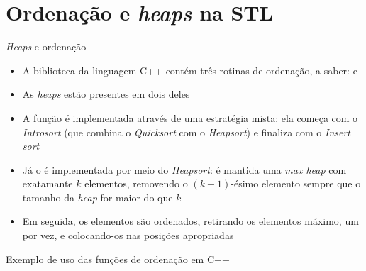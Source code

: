 \section{Ordenação e {\it heaps} na STL}

\begin{frame}[fragile]{{\it Heaps} e ordenação}

    \begin{itemize}
        \item A biblioteca  da linguagem C++ contém três rotinas de 
            ordenação, a saber:  e 

        \item As \textit{heaps} estão presentes em dois deles

        \item A função  é implementada através de uma estratégia mista: ela
            começa com o \textit{Introsort} (que combina o \textit{Quicksort} com o \textit{Heapsort}) e 
            finaliza com o \textit{Insert sort}

        \item Já o  é implementada por meio do \textit{Heapsort}: é mantida
            uma \textit{max heap} com exatamante $k$ elementos, removendo o $(k + 1)$-ésimo
            elemento sempre que o tamanho da \textit{heap} for maior do que $k$

        \item Em seguida, os elementos são ordenados, retirando os elementos máximo, um por vez,
            e colocando-os nas posições apropriadas
    \end{itemize}

\end{frame}

\begin{frame}[fragile]{Exemplo de uso das funções de ordenação em C++}
\end{frame}
